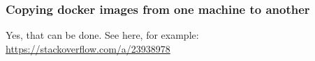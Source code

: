 \documentclass[a4paper,11pt]{article}
\begin{document}


\subsubsection{Copying docker images from one machine to another}
Yes, that can be done. See here, for example: \url{https://stackoverflow.com/a/23938978}






\end{document}

